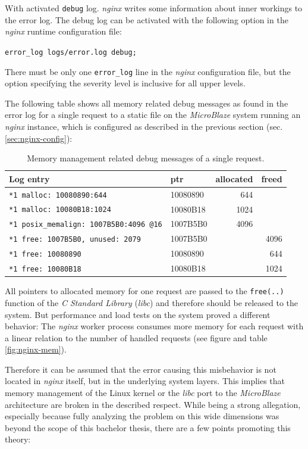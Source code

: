 With activated \texttt{debug} log. \textit{nginx} writes some information about inner workings to the error log. The debug log can be activated with the following option in the \textit{nginx} runtime configuration file:

\texttt{error\_log  logs/error.log  debug;}


There must be only one \texttt{error\_log} line in the \textit{nginx} configuration file, but the option specifying the severity level is inclusive for all upper levels.

The following table shows all memory related debug messages as found in the error log for a single request to a static file on the \textit{MicroBlaze} system running an \textit{nginx} instance, which is configured as described in the previous section (sec. \ref{sec:nginx-config}):

\begin{table}[H]
\centering
\begin{tabular}{|l|l|r|r|}
    \hline
     \textbf{Log entry} & \textbf{ptr} & \textbf{allocated} & \textbf{freed} \\
    \hline \hline
\texttt{*1 malloc: 10080890:644} & 10080890 & 644 &  \\ \hline
\texttt{*1 malloc: 10080B18:1024} & 10080B18 & 1024 &  \\ \hline
\texttt{*1 posix\_memalign: 1007B5B0:4096 @16} & 1007B5B0 & 4096 &  \\ \hline \hline
\texttt{*1 free: 1007B5B0, unused: 2079} & 1007B5B0 & & 4096 \\ \hline
\texttt{*1 free: 10080890} & 10080890 & & 644 \\ \hline
\texttt{*1 free: 10080B18} & 10080B18 & & 1024 \\ \hline
\end{tabular}
\caption{Memory management related debug messages of a single request.}
\label{tab:debug_mem}
\end{table}

All pointers to allocated memory for one request are passed to the \texttt{free(..)} function of the \textit{C Standard Library} (\textit{libc}) and therefore should be released to the system. But performance and load tests on the system proved a different behavior: The \textit{nginx} worker process consumes more memory for each request with a linear relation to the number of handled requests (see figure and table \ref{fig:nginx-mem}).

Therefore it can be assumed that the error causing this misbehavior is not located in \textit{nginx} itself, but in the underlying system layers. This implies that memory management of the Linux kernel or the \textit{libc} port to the \textit{MicroBlaze} architecture are broken in the described respect. While being a strong allegation, especially because fully analyzing the problem on this wide dimensions was beyond the scope of this bachelor thesis, there are a few points promoting this theory:


